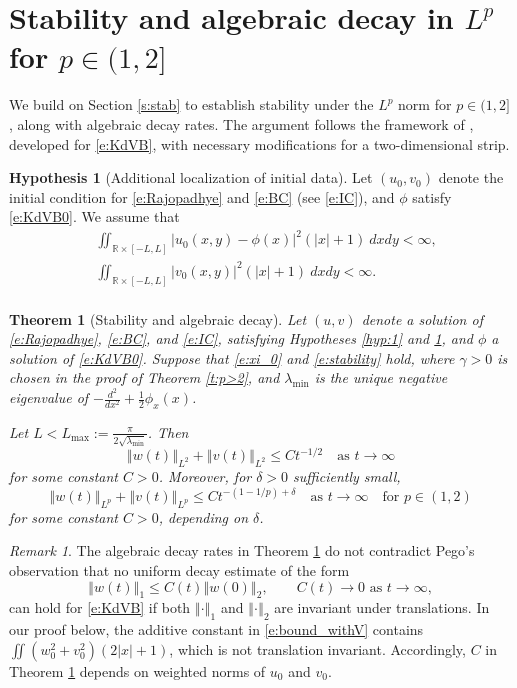 \documentclass[final,11pt]{article}
\renewcommand{\leq}{\leqslant}
\theoremstyle{definition} %
\newcommand{\lv}{\left\Vert}
\newcommand{\rv}{\right\Vert}
\newcommand{\R}{\mathbb{R}}
\theoremstyle{plain}
\newtheorem{theorem}{Theorem}[section]
\theoremstyle{definition} %
\newtheorem{hyp}{Hypothesis}
\theoremstyle{remark}
\newtheorem*{remark*}{Remark}
\begin{document}
\section{Stability and algebraic decay in \texorpdfstring{$L^p$}{} for \texorpdfstring{$p \in (1,2]$}{} }\label{s:decay}

We build on Section \ref{s:stab} to establish stability under the $L^p$ norm for $p \in (1,2]$, along with algebraic decay rates. The argument follows the framework of \cite{stanislavova2025asymptotic}, developed for \eqref{e:KdVB}, with necessary modifications for a two-dimensional strip.

\begin{hyp}[Additional localization of initial data]\label{hyp:2}
Let $(u_0,v_0)$ denote the initial condition for \eqref{e:Rajopadhye} and \eqref{e:BC} (see \eqref{e:IC}), and $\phi$ satisfy \eqref{e:KdVB0}. We assume that 
\begin{align*}
    &\iint_{\R \times [-L,L]} |u_0(x,y) - \phi(x)|^2(|x|+1)~dxdy < \infty,\\
    &\iint_{\R \times [-L,L]} |v_0(x,y)|^2(|x|+1)~dxdy < \infty. \\
\end{align*}
\end{hyp}

\begin{theorem}[Stability and algebraic decay]\label{t:stab_Lp_1<p<2}
Let $( u, v)$ denote a solution of \eqref{e:Rajopadhye}, \eqref{e:BC}, and \eqref{e:IC}, satisfying Hypotheses \ref{hyp:1} and \ref{hyp:2}, and $\phi$ a solution of \eqref{e:KdVB0}. Suppose that \eqref{e:xi_0} and \eqref{e:stability} hold, where $\gamma>0$ is chosen in the proof of Theorem \ref{t:p>2}, and $\lambda_{\min}$ is the unique negative eigenvalue of $-\frac{d^2}{dx^2} + \frac{1}{2}\phi_x(x)$. 

Let $L < L_{\max} := \frac{\pi}{2\sqrt{\lambda_{\min}}}$. Then 
\[
\lv w(t)\rv_{L^2}+\lv v(t)\rv_{L^2} \leq Ct^{-1/2} \quad \text{as $t\to\infty$}
\]
for some constant $C>0$. Moreover, for $\delta > 0$ sufficiently small,
\[
\lv w(t) \rv_{L^p}+\lv v(t) \rv_{L^p} \leq Ct^{-(1-1/p)+\delta} \quad \text{as $t\to\infty$}\quad \text{for $p \in (1, 2)$}
\]
for some constant $C>0$, depending on $\delta$.
\end{theorem}

\begin{remark*}\rm
The algebraic decay rates in Theorem \ref{t:stab_Lp_1<p<2} do not contradict Pego's observation \cite{Pego} that no uniform decay estimate of the form 
\[
\lv w(t)\rv_1\leq C(t)\lv w(0)\rv_2, \qquad \text{$C(t)\to0$ as $t\to\infty$},
\]
can hold for \eqref{e:KdVB} if both $\lv \cdot \rv_1$ and $\lv \cdot \rv_2$ are invariant under translations. In our proof below, the additive constant in \eqref{e:bound_withV} contains $\iint(w_0^2 + v_0^2)(2|x| + 1)$, which is not translation invariant. Accordingly, $C$ in Theorem \ref{t:stab_Lp_1<p<2} depends on weighted norms of $u_0$ and $v_0$. 
\end{remark*}
\end{document}

